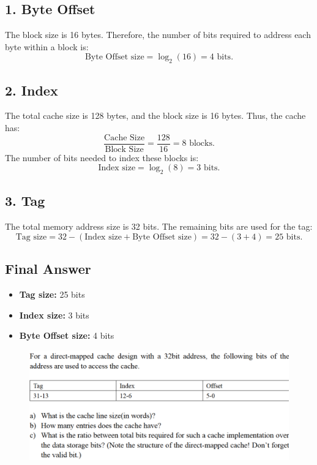 \documentclass[cn,12pt]{homework}
\begin{document}
\begin{solution}


\subsection*{1. Byte Offset}
The block size is 16 bytes. Therefore, the number of bits required to address each byte within a block is:
\[
\text{Byte Offset size} = \log_2(16) = 4 \text{ bits}.
\]

\subsection*{2. Index}
The total cache size is 128 bytes, and the block size is 16 bytes. Thus, the cache has:
\[
\frac{\text{Cache Size}}{\text{Block Size}} = \frac{128}{16} = 8 \text{ blocks}.
\]
The number of bits needed to index these blocks is:
\[
\text{Index size} = \log_2(8) = 3 \text{ bits}.
\]

\subsection*{3. Tag}
The total memory address size is 32 bits. The remaining bits are used for the tag:
\[
\text{Tag size} = 32 - (\text{Index size} + \text{Byte Offset size}) = 32 - (3 + 4) = 25 \text{ bits}.
\]

\subsection*{Final Answer}
\begin{itemize}
    \item \textbf{Tag size:} 25 bits
    \item \textbf{Index size:} 3 bits
    \item \textbf{Byte Offset size:} 4 bits
\end{itemize}



\end{solution}
\newpage



\begin{problem}
  \quad
  \begin{figure}[H]
    \centering
    \includegraphics[width=1\textwidth]{./figures/image2.png}
    \label{fig:pro1}
  \end{figure}



\end{problem}
\end{document}
